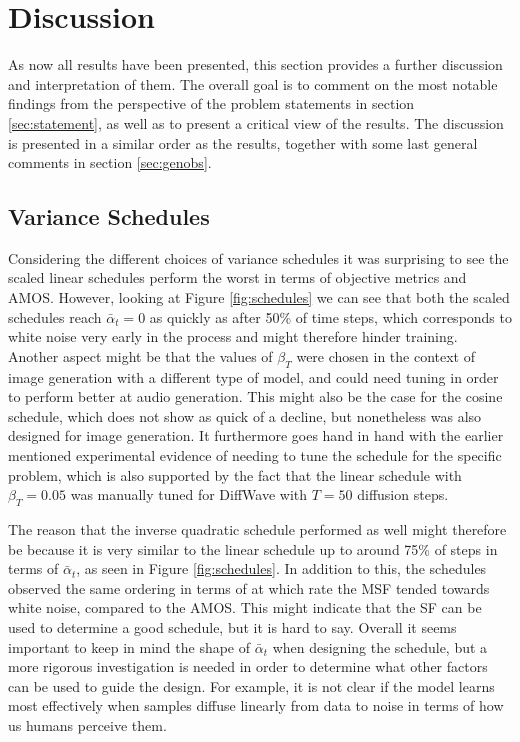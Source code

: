 \documentclass{report}
\begin{document}
\newpage
\chapter{Discussion}

As now all results have been presented, this section provides a further discussion and interpretation of them. The overall goal is to comment on the most notable findings from the perspective of the problem statements in section \ref{sec:statement}, as well as to present a critical view of the results. The discussion is presented in a similar order as the results, together with some last general comments in section \ref{sec:genobs}.

\section{Variance Schedules}

Considering the different choices of variance schedules it was surprising to see the scaled linear schedules perform the worst in terms of objective metrics and AMOS. However, looking at Figure \ref{fig:schedules} we can see that both the scaled schedules reach $\bar{\alpha}_t = 0$ as quickly as after 50\% of time steps, which corresponds to white noise very early in the process and might therefore hinder training. Another aspect might be that the values of $\beta_T$ were chosen in the context of image generation with a different type of model, and could need tuning in order to perform better at audio generation. This might also be the case for the cosine schedule, which does not show as quick of a decline, but nonetheless was also designed for image generation. It furthermore goes hand in hand with the earlier mentioned experimental evidence of needing to tune the schedule for the specific problem, which is also supported by the fact that the linear schedule with $\beta_T=0.05$ was manually tuned for DiffWave with $T=50$ diffusion steps.

The reason that the inverse quadratic schedule performed as well might therefore be because it is very similar to the linear schedule up to around 75\% of steps in terms of  $\bar{\alpha}_t$, as seen in Figure \ref{fig:schedules}. In addition to this, the schedules observed the same ordering in terms of at which rate the MSF tended towards white noise, compared to the AMOS. This might indicate that the SF can be used to determine a good schedule, but it is hard to say. Overall it seems important to keep in mind the shape of $\bar{\alpha}_t$ when designing the schedule, but a more rigorous investigation is needed in order to determine what other factors can be used to guide the design. For example, it is not clear if the model learns most effectively when samples diffuse linearly from data to noise in terms of how us humans perceive them.
\end{document}
